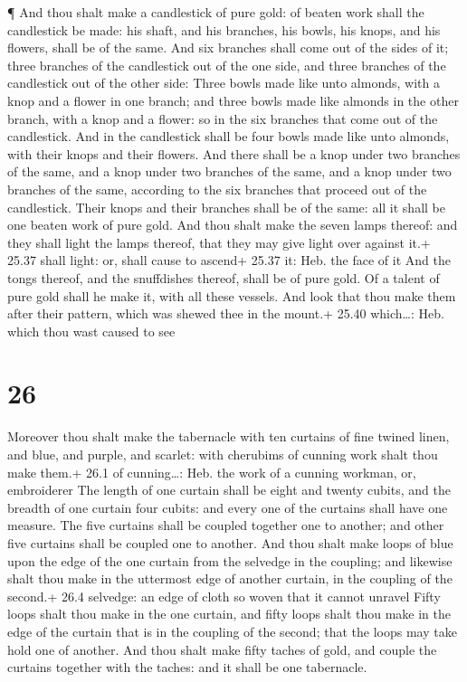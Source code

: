  ¶ And thou shalt make a candlestick of pure gold: of
beaten work shall the candlestick be made: his shaft, and his branches,
his bowls, his knops, and his flowers, shall be of the same.
 And six branches shall come out of the sides of it; three
branches of the candlestick out of the one side, and three branches of
the candlestick out of the other side:  Three bowls made
like unto almonds, with a knop and a flower in one branch; and three
bowls made like almonds in the other branch, with a knop and a flower:
so in the six branches that come out of the candlestick. 
And in the candlestick shall be four bowls made like unto almonds, with
their knops and their flowers.  And there shall be a knop
under two branches of the same, and a knop under two branches of the
same, and a knop under two branches of the same, according to the six
branches that proceed out of the candlestick.  Their knops
and their branches shall be of the same: all it shall be one beaten work
of pure gold.  And thou shalt make the seven lamps thereof:
and they shall light the lamps thereof, that they may give light over
against it.+ 25.37 shall light: or, shall cause to ascend+ 25.37 it:
Heb. the face of it  And the tongs thereof, and the
snuffdishes thereof, shall be of pure gold.  Of a talent of
pure gold shall he make it, with all these vessels.  And
look that thou make them after their pattern, which was shewed thee in
the mount.+ 25.40 which\ldots: Heb. which thou wast caused to see

\hypertarget{section-25}{%
\section{26}\label{section-25}}

 Moreover thou shalt make the tabernacle with ten curtains
of fine twined linen, and blue, and purple, and scarlet: with cherubims
of cunning work shalt thou make them.+ 26.1 of cunning\ldots: Heb. the
work of a cunning workman, or, embroiderer  The length of
one curtain shall be eight and twenty cubits, and the breadth of one
curtain four cubits: and every one of the curtains shall have one
measure.  The five curtains shall be coupled together one to
another; and other five curtains shall be coupled one to another.
 And thou shalt make loops of blue upon the edge of the one
curtain from the selvedge in the coupling; and likewise shalt thou make
in the uttermost edge of another curtain, in the coupling of the
second.+ 26.4 selvedge: an edge of cloth so woven that it cannot unravel
 Fifty loops shalt thou make in the one curtain, and fifty
loops shalt thou make in the edge of the curtain that is in the coupling
of the second; that the loops may take hold one of another. 
And thou shalt make fifty taches of gold, and couple the curtains
together with the taches: and it shall be one tabernacle.

